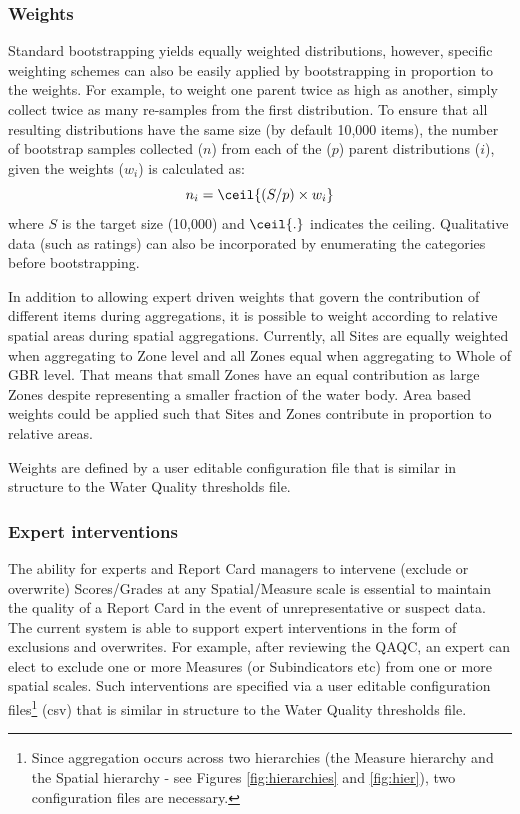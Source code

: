 \subsubsection{Weights}



Standard bootstrapping yields equally weighted distributions, however, specific weighting schemes
can also be easily applied by bootstrapping in proportion to the weights. For example, to weight one
parent twice as high as another, simply collect twice as many re-samples from the first
distribution. To ensure that all resulting distributions have the same size (by default 10,000
items), the number of bootstrap samples collected ($n$) from each of the ($p$) parent distributions
($i$), given the weights ($w_i$) is calculated as:
$$
n_i=\ceil{(S/p)\times w_i}
$$ 
where $S$ is the target size (10,000) and $\ceil{.}$ indicates the ceiling.  Qualitative data (such
as ratings) can also be incorporated by enumerating the categories before bootstrapping.


In addition to allowing expert driven weights that govern the contribution of different items during
aggregations, it is possible to weight according to relative spatial areas during spatial
aggregations.  Currently, all Sites are equally weighted when aggregating to Zone level and all
Zones equal when aggregating to Whole of GBR level.  That means that small Zones have an equal
contribution as large Zones despite representing a smaller fraction of the water body.  Area based
weights could be applied such that Sites and Zones contribute in proportion to relative areas.

Weights are defined by a user editable configuration file that is similar in structure to the Water
Quality thresholds file.


\subsubsection{Expert interventions}

The ability for experts and Report Card managers to intervene (exclude or overwrite) Scores/Grades
at any Spatial/Measure scale is essential to maintain the quality of a Report Card in the event of
unrepresentative or suspect data.  The current system is able to support expert interventions in the
form of exclusions and overwrites.  For example, after reviewing the QAQC, an expert can elect to
exclude one or more Measures (or Subindicators etc) from one or more spatial scales.  Such
interventions are specified via a user editable configuration files\footnote{Since aggregation
occurs across two hierarchies (the Measure hierarchy and the Spatial hierarchy - see Figures
\ref{fig:hierarchies} and \ref{fig:hier}), two configuration files are necessary.} (csv) that is
similar in structure to the Water Quality thresholds file.

